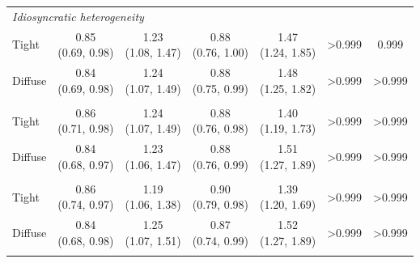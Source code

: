 {\begin{tabular}[t]{lcccccc}
\multicolumn{7}{l}{\textit{Idiosyncratic heterogeneity}}\\
\addlinespace
Tight & \makecell[c]{0.85\\(0.69, 0.98)} & \makecell[c]{1.23\\(1.08, 1.47)} & \makecell[c]{0.88\\(0.76, 1.00)} & \makecell[c]{1.47\\(1.24, 1.85)} & >0.999 & 0.999\\
\addlinespace
Diffuse & \makecell[c]{0.84\\(0.69, 0.98)} & \makecell[c]{1.24\\(1.07, 1.49)} & \makecell[c]{0.88\\(0.75, 0.99)} & \makecell[c]{1.48\\(1.25, 1.82)} & >0.999 & >0.999\\
\addlinespace
\multicolumn{7}{l}{\textit{Visibility schedule}}\\
\addlinespace
Tight & \makecell[c]{0.86\\(0.71, 0.98)} & \makecell[c]{1.24\\(1.07, 1.49)} & \makecell[c]{0.88\\(0.76, 0.98)} & \makecell[c]{1.40\\(1.19, 1.73)} & >0.999 & >0.999\\
\addlinespace
Diffuse & \makecell[c]{0.84\\(0.68, 0.97)} & \makecell[c]{1.23\\(1.06, 1.47)} & \makecell[c]{0.88\\(0.76, 0.99)} & \makecell[c]{1.51\\(1.27, 1.89)} & >0.999 & >0.999\\
\addlinespace
\multicolumn{7}{l}{\textit{Private utility}}\\
\addlinespace
Tight & \makecell[c]{0.86\\(0.74, 0.97)} & \makecell[c]{1.19\\(1.06, 1.38)} & \makecell[c]{0.90\\(0.79, 0.98)} & \makecell[c]{1.39\\(1.20, 1.69)} & >0.999 & >0.999\\
\addlinespace
Diffuse & \makecell[c]{0.84\\(0.68, 0.98)} & \makecell[c]{1.25\\(1.07, 1.51)} & \makecell[c]{0.87\\(0.74, 0.99)} & \makecell[c]{1.52\\(1.27, 1.89)} & >0.999 & >0.999\\
\addlinespace

\end{tabular}}
